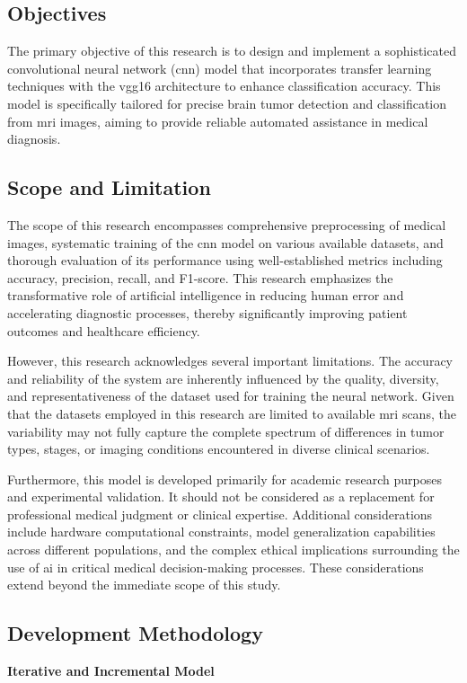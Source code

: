 \subsection{Objectives}
The primary objective of this research is to design and implement a
sophisticated convolutional neural network (\gls{cnn}) model that incorporates
transfer learning techniques with the \gls{vgg16} architecture to enhance
classification accuracy. This model is specifically tailored for precise brain
tumor detection and classification from \gls{mri} images, aiming to provide
reliable automated assistance in medical diagnosis.

\subsection{Scope and Limitation}
The scope of this research encompasses comprehensive preprocessing of medical
images, systematic training of the \gls{cnn} model on various available
datasets, and thorough evaluation of its performance using well-established
metrics including accuracy, precision, recall, and F1-score. This research
emphasizes the transformative role of artificial intelligence in reducing human
error and accelerating diagnostic processes, thereby significantly improving
patient outcomes and healthcare efficiency.

However, this research acknowledges several important limitations. The accuracy
and reliability of the system are inherently influenced by the quality,
diversity, and representativeness of the dataset used for training the neural
network. Given that the datasets employed in this research are limited to
available \gls{mri} scans, the variability may not fully capture the complete
spectrum of differences in tumor types, stages, or imaging conditions
encountered in diverse clinical scenarios.

Furthermore, this model is developed primarily for academic research purposes
and experimental validation. It should not be considered as a replacement for
professional medical judgment or clinical expertise. Additional considerations
include hardware computational constraints, model generalization capabilities
across different populations, and the complex ethical implications surrounding
the use of \gls{ai} in critical medical decision-making processes. These
considerations extend beyond the immediate scope of this study.

\subsection{Development Methodology}
\textbf{Iterative and Incremental Model}

